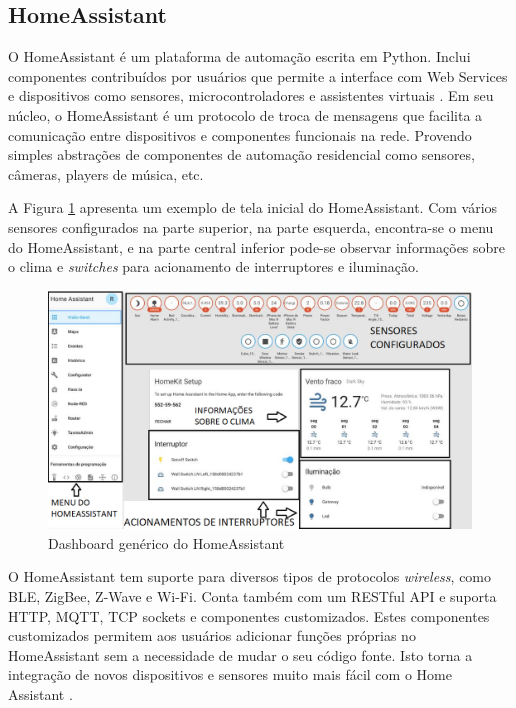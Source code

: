 \subsection{HomeAssistant}

O HomeAssistant é um plataforma de automação escrita em Python. Inclui componentes contribuídos por usuários que permite a interface com Web Services e dispositivos como sensores, microcontroladores e assistentes virtuais \cite{Lundrigan2017}. Em seu núcleo, o HomeAssistant é um protocolo de troca de mensagens que facilita a comunicação entre dispositivos e componentes funcionais na rede. Provendo simples abstrações de componentes de automação residencial como sensores, câmeras, players de música, etc.

A Figura \ref{fig:homeassistant-dash} apresenta um exemplo de tela inicial do HomeAssistant. Com vários sensores configurados na parte superior, na parte esquerda, encontra-se o menu do HomeAssistant, e na parte central inferior pode-se observar informações sobre o clima e \textit{switches} para acionamento de interruptores e iluminação.

\begin{figure}[htbp]
	\centering
	\includegraphics[width=1\linewidth]{figuras/homeassistant-dash.png}
	\caption{Dashboard genérico do HomeAssistant}
	\label{fig:homeassistant-dash}
\end{figure}

O HomeAssistant tem suporte para diversos tipos de protocolos \textit{wireless}, como BLE, ZigBee, Z-Wave e Wi-Fi. Conta também com um RESTful API e suporta HTTP, MQTT, TCP sockets e componentes customizados. Estes componentes customizados permitem aos usuários adicionar funções próprias no HomeAssistant sem a necessidade de mudar o seu código fonte. Isto torna a integração de novos dispositivos e sensores muito mais fácil com o Home Assistant \cite{Gomes2018}.


